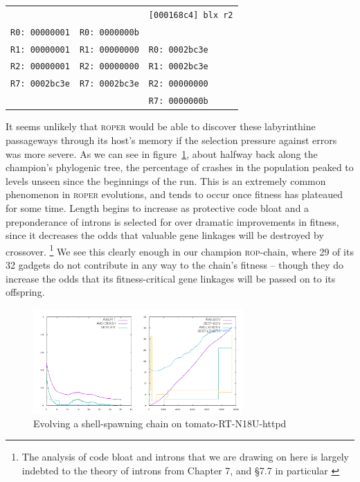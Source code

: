 \begin{table}
\begin{center}
{\begin{tabular}{|l|l|l|}
 					&							& \texttt{[000168c4]  blx r2} \\
\texttt{R0: 00000001}			& \texttt{R0: 0000000b}				& \\
\texttt{R1: 00000001}			& \texttt{R1: 00000000}				& \texttt{R0: 0002bc3e} \\
\texttt{R2: 00000001}			& \texttt{R2: 00000000}				& \texttt{R1: 0002bc3e} \\
\texttt{R7: 0002bc3e}				& \texttt{R7: 0002bc3e}				& \texttt{R2: 00000000} \\
					&							& \texttt{R7: 0000000b} \\ \hline
\end{tabular}
}
\end{center}
\end{table}%



It seems unlikely that \textsc{roper} would be able to discover
these labyrinthine passageways through its host's memory if the
selection pressure against errors was more severe.
As we can see in figure~\ref{shellpattern-graph}, about halfway
back along the champion's phylogenic tree, the percentage of
crashes in the population peaked to levels unseen since the
beginnings of the run. This is an extremely common phenomenon in
\textsc{roper} evolutions, and tends to occur once fitness has
plateaued for some time. Length begins to increase as protective
code bloat and a preponderance of introns is selected for over
dramatic improvements in fitness, since it decreases the odds
that valuable gene linkages will be destroyed by crossover.%
\footnote{The analysis of code bloat and introns that we are
  drawing on here is largely indebted to the theory of introns from Chapter 7, and \S{7.7} in particular \cite{brameier07}}
We see this clearly enough in our champion \textsc{rop}-chain,
where 29 of its 32 gadgets do not contribute in any way to the
chain's fitness -- though they do increase the odds that its
fitness-critical gene linkages will be passed on to its
offspring. 
\begin{figure}
  \includegraphics[height=4cm]{examples/shellpattern/shellpattern.png}
  \caption{Evolving a shell-spawning chain on {tomato-RT-N18U-httpd}}
  \label{shellpattern-graph}
\end{figure}


